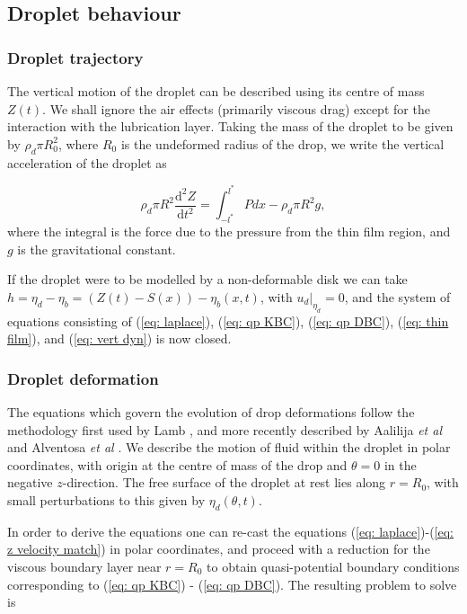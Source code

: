 \subsection{Droplet behaviour}

\subsubsection{Droplet trajectory}
The vertical motion of the droplet can be described using its centre of mass $Z(t)$. We shall ignore the air effects (primarily viscous drag) except for the interaction with the lubrication layer. Taking the mass of the droplet to be given by $\rho_d \pi R_0^2$, where $R_0$ is the undeformed radius of the drop, we write the vertical acceleration of the droplet as 

\begin{equation}\label{eq: vert dyn}
    \rho_d \pi R^2 \frac{\text{d}^2 Z}{\text{d}t^2} = \int_{-l^*}^{l^*} P dx - \rho_d \pi R^2 g,
\end{equation}
where the integral is the force due to the pressure from the thin film region, and $g$ is the gravitational constant.

If the droplet were to be modelled by a non-deformable disk we can take $h = \eta_d - \eta_b = (Z(t)-S(x))-\eta_b(x,t)$, with $u_d|_{\eta_d}=0$, and the system of equations consisting of (\ref{eq: laplace}), (\ref{eq: qp KBC}), (\ref{eq: qp DBC}), (\ref{eq: thin film}), and (\ref{eq: vert dyn}) is now closed.

\subsubsection{Droplet deformation}
The equations which govern the evolution of drop deformations follow the methodology first used by Lamb \cite{lamb1924hydrodynamics}, and more recently described by Aalilija \textit{et al} \cite{aalilija2020analytical} and Alventosa \textit{et al} \cite{alventosa2023inertio}. 
We describe the motion of fluid within the droplet in polar coordinates, with origin at the centre of mass of the drop and $\theta =0$ in the negative $z$-direction. The free surface of the droplet at rest lies along $r=R_0$, with small perturbations to this given by $\eta_d(\theta,t)$. 

In order to derive the equations one can re-cast the equations (\ref{eq: laplace})-(\ref{eq: z velocity match}) in polar coordinates, and proceed with a reduction for the viscous boundary layer near $r=R_0$ to obtain quasi-potential boundary conditions corresponding to (\ref{eq: qp KBC}) - (\ref{eq: qp DBC}). The resulting problem to solve is 

